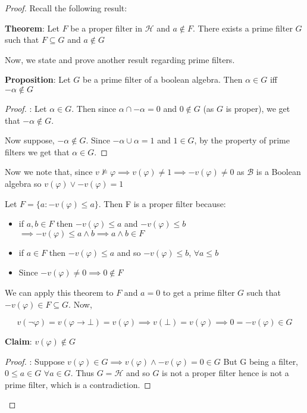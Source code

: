 \documentclass[12pt]{article}
\begin{document}
\begin{proof}
Recall the following result:

\textbf{Theorem}: Let $F$ be a proper filter in $\mathcal{H}$ and $a \not \in F$. There exists a prime filter $G$ such that $F \subseteq G$ and $a \not \in G$

Now, we state and prove another result regarding prime filters.

\textbf{Proposition}: Let $G$ be a prime filter of a boolean algebra. Then $\alpha \in G$ iff $-\alpha \not \in G$

\begin{proof}: Let $\alpha \in G$. Then since $\alpha \cap -\alpha = 0$ and $0 \not \in G$ (as $G$ is proper), we get that $-\alpha \not \in G$.

Now suppose, $-\alpha \not \in G$. Since $-\alpha \cup \alpha = 1$ and $1 \in G$, by the property of prime filters we get that $\alpha \in G$.
\end{proof}

Now we note that, since $v \not \models \varphi \implies v(\varphi) \neq 1 \implies -v(\varphi) \neq 0$ as $\mathcal{B}$ is a Boolean algebra so $v(\varphi) \vee -v(\varphi) = 1$

Let $F = \{a : -v(\varphi) \leq a\}$. Then F is a proper filter because:
\begin{itemize}
    \item if $a,b \in F$ then $-v(\varphi) \leq a$ and $-v(\varphi) \leq b$ $\implies -v(\varphi) \leq a \wedge b \implies a \wedge b \in F$
    \item if $a \in F$ then $-v(\varphi) \leq a$ and so $-v(\varphi) \leq b$, $\forall a \leq b$
    \item Since $-v(\varphi) \neq 0 \implies 0 \not \in F$
\end{itemize}

We can apply this theorem to $F$ and $a = 0$ to get a prime filter $G$ such that $-v(\varphi) \in F \subseteq G$. Now,

$$v(\neg \varphi) = v(\varphi \rightarrow \bot) = v(\varphi) \implies v(\bot) = v(\varphi) \implies 0 = -v(\varphi) \in G$$

\textbf{Claim}: $v(\varphi) \not \in G$
\begin{proof}: Suppose $v(\varphi) \in G \implies v(\varphi) \wedge -v(\varphi) = 0 \in G$ But G being a filter, $0 \leq a \in G$ $\forall a \in G$. Thus $G = \mathcal{H}$ and so $G$ is not a proper filter hence is not a prime filter, which is a contradiction.
\end{proof}


\end{proof}
\end{document}
